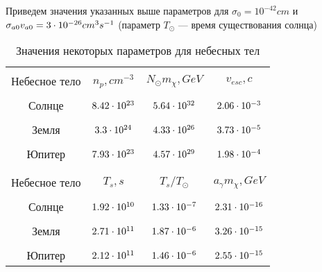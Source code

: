 Приведем значения указанных выше параметров для $\sigma_0 = 10^{-42} cm$ и $\sigma_{a0} v_{a0} = {3}\cdot 10^{-26} cm^3 s^{-1}$ (параметр $T_{\odot}$ --- время существования солнца)
\begin{table}[ht]
	\begin{center}
		
		\begin{tabular}{|c||c|c|c|}
			\hline &&&\\[-1em] 
			Небесное тело & $n_p, cm^{-3}$ & $N_{\odot} m_{\chi},  GeV$ & $v_{esc}, c$ \\
			\hline &&&\\[-1em] 
			Солнце & ${8.42}\cdot 10^{23}$ & ${5.64}\cdot 10^{32}$ & ${2.06}\cdot 10^{-3}$ \\
			\hline  &&&\\[-1em] 
			Земля & ${3.3}\cdot 10^{24}$ & ${4.33}\cdot 10^{26}$ & ${3.73}\cdot 10^{-5}$  \\
			\hline &&&\\[-1em] 
			Юпитер & ${7.93}\cdot 10^{23}$ & ${4.57}\cdot 10^{29}$ & ${1.98}\cdot 10^{-4}$ \\
			\hline &&&\\[-1em] 
			\hline &&&\\[-1em] 
			Небесное тело & $T_s, s$ & $T_s/T_{\odot}$ & $a_{\gamma} m_{\chi}, GeV$\\
			\hline &&&\\[-1em] 
			Солнце & ${1.92}\cdot 10^{10}$ & ${1.33}\cdot 10^{-7}$ & ${2.31}\cdot 10^{-16}$\\
			\hline &&&\\[-1em] 
			Земля & ${2.71}\cdot 10^{11}$ & ${1.87}\cdot 10^{-6}$ & ${3.26}\cdot 10^{-15}$\\
			\hline &&&\\[-1em] 
			Юпитер & ${2.12}\cdot 10^{11}$ & ${1.46}\cdot 10^{-6}$ & ${2.55}\cdot 10^{-15}$\\
			\hline
		\end{tabular}
		\caption{Значения некоторых параметров для небесных тел}
	\end{center}		
	\label{tb:Ts_number}
\end{table}


